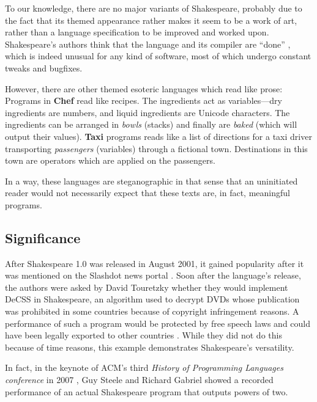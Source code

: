 To our knowledge, there are no major variants of Shakespeare, probably due to the fact that its themed appearance rather makes it seem to be a work of art, rather than a language specification to be improved and worked upon. Shakespeare's authors think that the language and its compiler are “done” \cite{herrick2011az}, which is indeed unusual for any kind of software, most of which undergo constant tweaks and bugfixes.

However, there are other themed esoteric languages which read like prose: Programs in \textbf{Chef} read like recipes. The ingredients act as variables---dry ingredients are numbers, and liquid ingredients are Unicode characters. The ingredients can be arranged in \emph{bowls} (stacks) and finally are \emph{baked} (which will output their values). \textbf{Taxi} programs reads like a list of directions for a taxi driver transporting \emph{passengers} (variables) through a fictional town. Destinations in this town are operators which are applied on the passengers.

In a way, these languages are steganographic in that sense that an uninitiated reader would not necessarily expect that these texts are, in fact, meaningful programs.

\subsection{Significance}

After Shakespeare 1.0 was released in August 2001, it gained popularity after it was mentioned on the Slashdot news portal \cite{tjernlund2001shakespeare}. Soon after the language's release, the authors were asked by David Touretzky whether they would implement DeCSS in Shakespeare, an algorithm used to decrypt DVDs whose publication was prohibited in some countries because of copyright infringement reasons. A performance of such a program would be protected by free speech laws and could have been legally exported to other countries \cite{herrick2011az}. While they did not do this because of time reasons, this example demonstrates Shakespeare's versatility.

In fact, in the keynote of ACM's third \emph{History of Programming Languages conference} in 2007 \cite{chapiewski2007computational}, Guy Steele and Richard Gabriel showed a recorded performance of an actual Shakespeare program that outputs powers of two.
